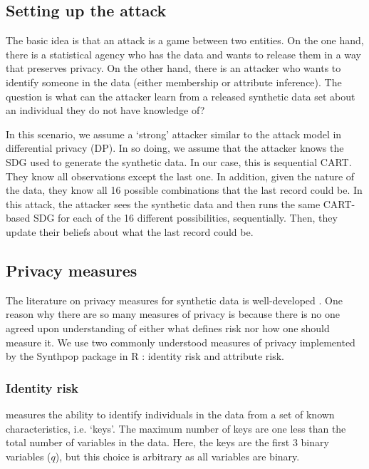\documentclass[runningheads]{llncs}
\begin{document}
\subsection{Setting up the attack}

The basic idea is that an attack is a game between two entities.  On the one hand, there is a statistical agency who has the data and wants to release them in a way that preserves privacy.  On the other hand, there is an attacker who wants to identify someone in the data (either membership or attribute inference). The question is what can the attacker learn from a released synthetic data set about an individual they do not have knowledge of?

In this scenario, we assume a `strong' attacker similar to the attack model in differential privacy (DP).  In so doing, we assume that the attacker knows the SDG used to generate the synthetic data.  In our case, this is sequential CART.  They know all observations except the last one.  In addition, given the nature of the data, they know all 16 possible combinations that the last record could be.  In this attack, the attacker sees the synthetic data and then runs the same CART-based SDG for each of the 16 different possibilities, sequentially.  Then, they update their beliefs about what the last record could be.

\subsection{Privacy measures}

The literature on privacy measures for synthetic data is well-developed \cite{wagner2018technical}.  One reason why there are so many measures of privacy is because there is no one agreed upon understanding of either what defines risk nor how one should measure it.  We use two commonly understood measures of privacy implemented by the Synthpop package in R \cite{raab2024practical}: identity risk and attribute risk.  

\subsubsection{Identity risk} measures the ability to identify individuals in the data from a set of known characteristics, i.e. `keys'. The maximum number of keys are one less than the total number of variables in the data.  Here, the keys are the first 3 binary variables ($q$), but this choice is arbitrary as all variables are binary.  
\end{document}
